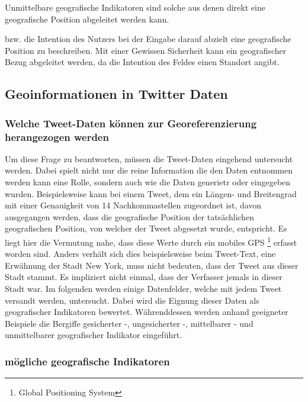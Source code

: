 				Unmittelbare geografische Indikatoren sind solche aus denen direkt eine geografische Position abgeleitet werden kann.

				 bzw. die Intention des Nutzers bei der Eingabe darauf abzielt eine geografische Position zu beschreiben.  
				Mit einer Gewissen Sicherheit kann ein geografischer Bezug abgeleitet werden, da die Intention des Feldes einen Standort angibt. 




	 	\subsection{Geoinformationen in Twitter Daten}
	 		\subsubsection{Welche Tweet-Daten können zur Georeferenzierung herangezogen werden}  

				Um diese Frage zu beantworten, müssen die Tweet-Daten eingehend untersucht werden. 
				Dabei spielt nicht nur die reine Information die den Daten entnommen werden kann eine Rolle, sondern auch wie die Daten generietr oder eingegeben wurden.
				Beispielsweise kann bei einem Tweet, dem ein Längen- und Breitengrad mit einer Genauigkeit von 14 Nachkommastellen zugeordnet ist, davon ausgegangen werden, dass die geografische Position der tatsächlichen geografischen Position, von welcher der Tweet abgesetzt wurde, entspricht. 
				Es liegt hier die Vermutung nahe, dass diese Werte durch ein mobiles GPS \footnote{Global Positioning System} erfasst worden sind. 
				Anders verhält sich dies beispielsweise beim Tweet-Text, eine Erwähnung der Stadt New York, muss nicht bedeuten, dass der Tweet aus dieser Stadt stammt. 
				Es impliziert nicht einmal, dass der Verfasser jemals in dieser Stadt war.  
				Im folgenden werden einige Datenfelder, welche mit jedem Tweet versandt werden, untersucht.
				Dabei wird die Eignung dieser Daten als geografischer Indikatoren bewertet.
				Währenddessen werden anhand geeigneter Beispiele die Bergiffe gesicherter -, ungesicherter -, mittelbarer - und unmittelbarer geografischer Indikator eingeführt.  

			\subsubsection{mögliche geografische Indikatoren} 

